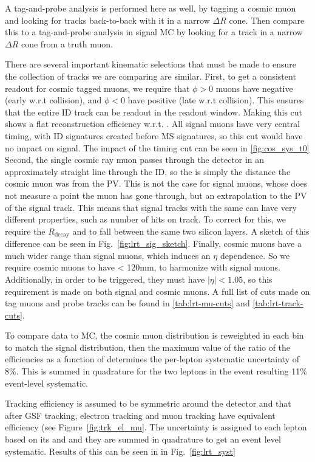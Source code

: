A tag-and-probe analysis is performed here as well, by tagging a cosmic muon and looking for tracks back-to-back with it in a narrow $\Delta R$ cone. Then compare this to a tag-and-probe analysis in signal \ac{MC} by looking for a track in a narrow $\Delta R$ cone from a truth muon. 

There are several important kinematic selections that must be made to ensure the collection of tracks we are comparing are similar. First, to get a consistent readout for cosmic tagged muons, we require that $\phi > 0$ muons have negative \tavg (early w.r.t collision), and $\phi < 0$ have positive \tavg (late w.r.t collision). This ensures that the entire \ac{ID} track can be readout in the readout window. Making this cut shows a flat reconstruction efficiency w.r.t. \tavg. All signal muons have very central timing, with \ac{ID} signatures created before \ac{MS} signatures, so this cut would have no impact on signal. The impact of the timing cut can be seen in \autoref{fig:cos_sys_t0} Second, the single cosmic ray muon passes through the detector in an approximately straight line through the \ac{ID}, so the \dz is simply the distance the cosmic muon was from the PV. This is not the case for signal muons, whose \dz does not measure a point the muon has gone through, but an extrapolation to the PV of the signal track. This means that signal tracks with the same \dz can have very different properties, such as number of hits on track. To correct for this, we require the $R_{\textrm{decay}}$ and \dz to fall between the same two silicon layers. A sketch of this difference can be seen in Fig.~\ref{fig:lrt_sig_sketch}. Finally, cosmic muons have a much wider \z range than signal muons, which induces an $\eta$ dependence. So we require cosmic muons to have \absz < 120mm, to harmonize with signal muons. Additionally, in order to be triggered, they must have $|\eta| < 1.05$, so this requirement is made on both signal and cosmic muons. A full list of cuts made on tag muons and probe tracks can be found in \autoref{tab:lrt-mu-cuts} and \autoref{tab:lrt-track-cuts}.

To compare data to MC, the cosmic muon \pt distribution is reweighted in each \absdz bin to match the signal distribution, then the maximum value of the ratio of the efficiencies as a function of \absdz determines the per-lepton systematic uncertainty of 8\%. This is summed in quadrature for the two leptons in the event resulting 11\% event-level systematic. 
 
Tracking efficiency is assumed to be symmetric around the detector and that after GSF tracking, electron tracking and muon tracking have equivalent efficiency (see Figure~\ref{fig:trk_el_mu}. The uncertainty is assigned to each lepton based on its \pt and \absdz and they are summed in quadrature to get an event level systematic. Results of this can be seen in in Fig.~\ref{fig:lrt_syst}




